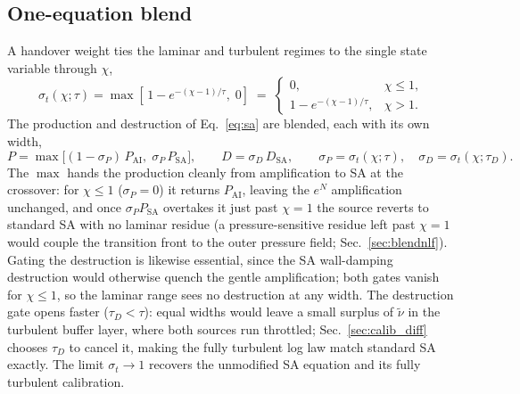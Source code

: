 \documentclass[journal]{new-aiaa}
\begin{document}
\subsection{One-equation blend}
A handover weight ties the laminar and turbulent regimes to the single state
variable through $\chi$,
\begin{equation}
  \sigma_t(\chi;\tau) = \max\!\left[\,1-e^{-(\chi-1)/\tau},\;0\right] \;=\;
  \begin{cases} 0, & \chi \le 1, \\ 1-e^{-(\chi-1)/\tau}, & \chi > 1. \end{cases}
  \label{eq:sigma}
\end{equation}
The
production and destruction of Eq.~\eqref{eq:sa} are blended, each with its own
width,
\begin{equation}
  P = \max\!\big[(1-\sigma_P)\,P_\mathrm{AI},\;\sigma_P\,P_\mathrm{SA}\big], \qquad
  D = \sigma_D\,D_\mathrm{SA}, \qquad
  \sigma_P = \sigma_t(\chi;\tau), \quad \sigma_D = \sigma_t(\chi;\tau_D).
  \label{eq:blend}
\end{equation}
The $\max$ hands the production cleanly from amplification to SA at the
crossover: for $\chi\!\le\!1$ ($\sigma_P\!=\!0$) it returns $P_\mathrm{AI}$,
leaving the $e^N$ amplification unchanged, and once $\sigma_P P_\mathrm{SA}$
overtakes it just past $\chi\!=\!1$ the source reverts to standard SA with no
laminar residue (a pressure-sensitive residue left past $\chi\!=\!1$ would couple
the transition front to the outer pressure field; Sec.~\ref{sec:blendnlf}).
Gating the destruction is likewise
essential, since the SA wall-damping destruction would otherwise quench the
gentle amplification; both gates vanish for $\chi\!\le\!1$, so the
laminar range sees no destruction at any width. The destruction gate opens
faster ($\tau_D\!<\!\tau$): equal widths would leave a small surplus of
$\tilde\nu$ in the turbulent buffer layer, where both sources run throttled;
Sec.~\ref{sec:calib_diff} chooses $\tau_D$ to cancel it, making the fully
turbulent log law match standard SA exactly. The limit
$\sigma_t\!\to\!1$ recovers the unmodified SA
equation and its fully turbulent calibration.
\end{document}
